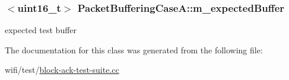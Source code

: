 \subsubsection[{\texorpdfstring{m\+\_\+expected\+Buffer}{m_expectedBuffer}}]{$<$uint16\+\_\+t$>$ Packet\+Buffering\+Case\+A\+::m\+\_\+expected\+Buffer\hspace{0.3cm}{\ttfamily [private]}}\hypertarget{classPacketBufferingCaseA_a9984383a1d31e0e704c530dfdd28e2d6}{}\label{classPacketBufferingCaseA_a9984383a1d31e0e704c530dfdd28e2d6}


expected test buffer 



The documentation for this class was generated from the following file\+:\begin{DoxyCompactItemize}
\item 
wifi/test/\hyperlink{block-ack-test-suite_8cc}{block-\/ack-\/test-\/suite.\+cc}\end{DoxyCompactItemize}
